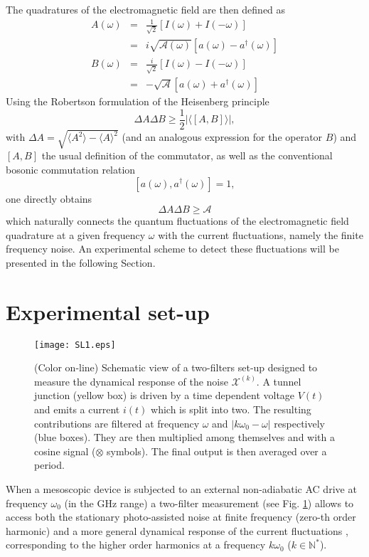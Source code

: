 \documentclass[twocolumn,showpacs,preprintnumbers,amsmath,amssymb%
 aps,
 prb,
 lengthcheck,%
]{revtex4-1}
\def\be{\begin{equation}}
\def\ee{\end{equation}}
\def\beq{\begin{eqnarray}}
\def\eeq{\end{eqnarray}}
\begin{document}
The quadratures of the electromagnetic field are then defined as \cite{gasse_observation_2013}
\beq
A(\omega)&=&\frac{1}{\sqrt{2}}\left[I(\omega) +I(-\omega)\right]\nonumber \\
&=&i \sqrt{\mathcal{A}(\omega)} \left[a(\omega)-a^{\dagger}(\omega) \right]\\
B(\omega)&=&\frac{i}{\sqrt{2}}\left[I(\omega) -I(-\omega)\right]\nonumber\\
&=&-\sqrt{\mathcal{A}} \left[a(\omega)+a^{\dagger}(\omega) \right]
\eeq
Using the Robertson formulation of the Heisenberg principle 
\be
\Delta A \Delta B\geq \frac{1}{2} |\langle\left[A, B\right] \rangle |,
\ee
with $\Delta A=\sqrt{\langle A^{2}\rangle-\langle A \rangle^{2}}$ (and an analogous expression for the operator $B$) and $\left[A,B\right]$ the usual definition of the commutator, as well as the conventional bosonic commutation relation
\be
\left[ a(\omega), a^{\dagger}(\omega)\right]=1,
\ee
one directly obtains 
\be
\Delta A \Delta B\geq \mathcal{A}
\ee
which naturally connects the quantum fluctuations of the electromagnetic field quadrature at a given frequency $\omega$ with the current fluctuations, namely the finite frequency noise. An experimental scheme to detect these fluctuations will be presented in the following Section. 

\section{Experimental set-up}\label{Setup}
\begin{figure}[h]
\centering
\texttt{[image: SL1.eps]}
\caption{(Color on-line) Schematic view of a two-filters set-up designed to measure the dynamical response of the noise $\mathcal{X}^{(k)}$. A tunnel junction (yellow box) is driven by a time dependent voltage $V(t)$ and emits a current $i(t)$ which is split into two. The resulting contributions are filtered at frequency $\omega$ and $|k \omega_{0}-\omega|$ respectively (blue boxes). They are then multiplied among themselves and with a cosine signal ($\otimes$ symbols). The final output is then averaged over a period.}
\label{fig1}
\end{figure}  

When a mesoscopic device is subjected to an external non-adiabatic AC drive at frequency $\omega_{0}$ (in the GHz range) a two-filter measurement (see Fig. \ref{fig1}) allows to access both the stationary photo-assisted noise at finite frequency \cite{blanter_shot_2000, martin_noise_2005, lesovik_noise_1994, schoelkopf_observation_1998} (zero-th order harmonic) and a more general dynamical response of the current fluctuations \cite{gabelli_dynamics_2008, gabelli_noise_2008}, corresponding to the higher order harmonics at a frequency $k\omega_{0}$ ($k \in \mathbb N^{*}$).
\end{document}
